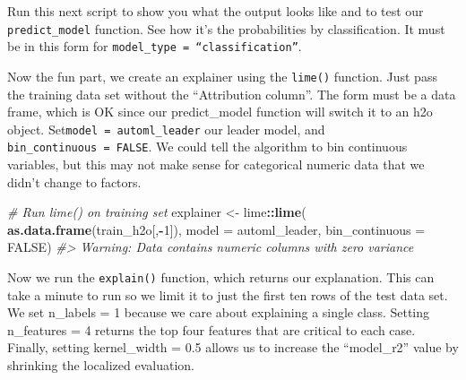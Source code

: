 \documentclass[]{book}
\newenvironment{Shaded}{\begin{snugshade}}{\end{snugshade}}
\newcommand{\CommentTok}[1]{\textcolor[rgb]{0.56,0.35,0.01}{\textit{#1}}}
\newcommand{\DataTypeTok}[1]{\textcolor[rgb]{0.13,0.29,0.53}{#1}}
\newcommand{\DecValTok}[1]{\textcolor[rgb]{0.00,0.00,0.81}{#1}}
\newcommand{\KeywordTok}[1]{\textcolor[rgb]{0.13,0.29,0.53}{\textbf{#1}}}
\newcommand{\NormalTok}[1]{#1}
\newcommand{\OperatorTok}[1]{\textcolor[rgb]{0.81,0.36,0.00}{\textbf{#1}}}
\newcommand{\OtherTok}[1]{\textcolor[rgb]{0.56,0.35,0.01}{#1}}
\newcommand{\StringTok}[1]{\textcolor[rgb]{0.31,0.60,0.02}{#1}}
\begin{document}
Run this next script to show you what the output looks like and to test our \texttt{predict\_model} function. See how it's the probabilities by classification. It must be in this form for \texttt{model\_type\ =\ “classification”}.

\begin{Shaded}
\end{Shaded}

Now the fun part, we create an explainer using the \texttt{lime()} function. Just pass the training data set without the ``Attribution column''. The form must be a data frame, which is OK since our predict\_model function will switch it to an h2o object. Set\texttt{model\ =\ automl\_leader} our leader model, and \texttt{bin\_continuous\ =\ FALSE}. We could tell the algorithm to bin continuous variables, but this may not make sense for categorical numeric data that we didn't change to factors.\\

\begin{Shaded}
\begin{Highlighting}[]
\CommentTok{# Run lime() on training set}
\NormalTok{explainer <-}\StringTok{ }\NormalTok{lime}\OperatorTok{::}\KeywordTok{lime}\NormalTok{(}
    \KeywordTok{as.data.frame}\NormalTok{(train_h2o[,}\OperatorTok{-}\DecValTok{1}\NormalTok{]), }
    \DataTypeTok{model          =}\NormalTok{ automl_leader, }
    \DataTypeTok{bin_continuous =} \OtherTok{FALSE}\NormalTok{)}
\CommentTok{#> Warning: Data contains numeric columns with zero variance}
\end{Highlighting}
\end{Shaded}

Now we run the \texttt{explain()} function, which returns our explanation. This can take a minute to run so we limit it to just the first ten rows of the test data set. We set n\_labels = 1 because we care about explaining a single class. Setting n\_features = 4 returns the top four features that are critical to each case. Finally, setting kernel\_width = 0.5 allows us to increase the ``model\_r2'' value by shrinking the localized evaluation.\\
\end{document}
